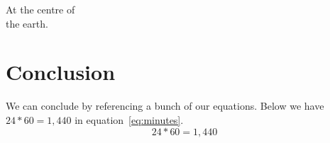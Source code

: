 \documentclass{article}
\begin{document}
\begin{center}
At the centre of \\ the earth.
\end{center}


\section{Conclusion}
We can conclude by referencing a bunch of our equations. Below we have $24 * 60 = 1,440$ in equation~\ref{eq:minutes}.
\begin{equation}
24 * 60 = 1,440 
\label{eq:minutes}
\end{equation}
\end{document}

